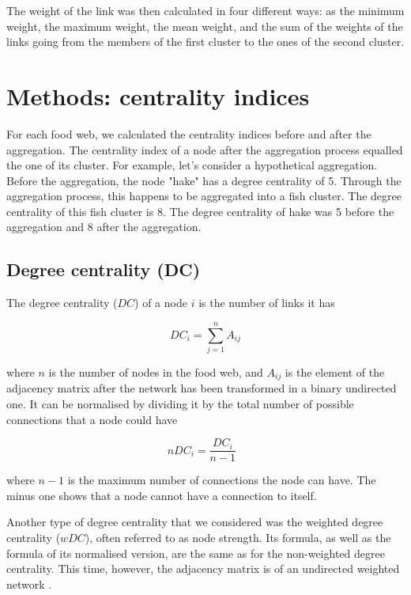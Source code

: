 \documentclass[twocolumn]{article}
\begin{document}
	The weight of the link was then calculated in four different ways: as the minimum weight, the maximum weight, the mean weight, and the sum of the weights of the links going from the members of the first cluster to the ones of the second cluster.

\section*{Methods: centrality indices}

	For each food web, we calculated the centrality indices before and after the aggregation. The centrality index of a node after the aggregation process equalled the one of its cluster. For example, let's consider a hypothetical aggregation. Before the aggregation, the node "hake" has a degree centrality of 5. Through the aggregation process, this happens to be aggregated into a fish cluster. The degree centrality of this fish cluster is 8. The degree centrality of hake was 5 before the aggregation and 8 after the aggregation.

	\subsection*{Degree centrality (DC)}

		The degree centrality ($DC$) of a node $i$ is the number of links it has \citep{Wasserman1994}

					\begin{equation}
								DC_i=\sum_{j=1}^{n}A_{ij}
					\end{equation}

		\noindent where $n$ is the number of nodes in the food web, and $A_{ij}$ is the element of the adjacency matrix after the network has been transformed in a binary undirected one. It can be normalised by dividing it by the total number of possible connections that a node could have \citep{Wasserman1994}

					\begin{equation}
								nDC_i=\frac{DC_i}{n-1}\ \ \
					\end{equation}

		\noindent where $n-1$ is the maximum number of connections the node can have. The minus one shows that a node cannot have a connection to itself.

		Another type of degree centrality that we considered was the weighted degree centrality ($wDC$), often referred to as node strength. Its formula, as well as the formula of its normalised version, are the same as for the non-weighted degree centrality. This time, however, the adjacency matrix is of an undirected weighted network \citep{Fornito2016}.
\end{document}

